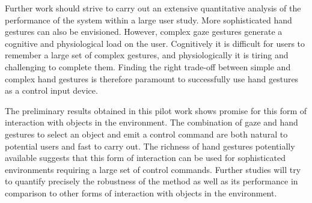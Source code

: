 \documentclass[jou,a4paper,notxfonts]{apa}
\begin{document}
Further work should strive to carry out an extensive quantitative analysis of the performance of the system within a
large user study. More sophisticated hand gestures can also be envisioned. However, complex gaze gestures generate a
cognitive and physiological load on the user. Cognitively it is difficult for users to remember a large set of complex
gestures, and physiologically it is tiring and challenging to complete them. Finding the right trade-off between simple
and complex hand gestures is therefore paramount to successfully use hand gestures as a control input device.


The preliminary results obtained  in this pilot work shows promise for this form of interaction with objects in the
environment. The combination of gaze and hand gestures to select an object  and emit a control command are both natural 
to potential users and fast to carry out. The richness of hand gestures potentially available suggests that this form of
interaction can be used for sophisticated environments requiring  a large set of control commands.
Further studies will try to quantify precisely the robustness of the method as well as its performance in comparison to
other forms of interaction  with objects in the environment.



\end{document}
